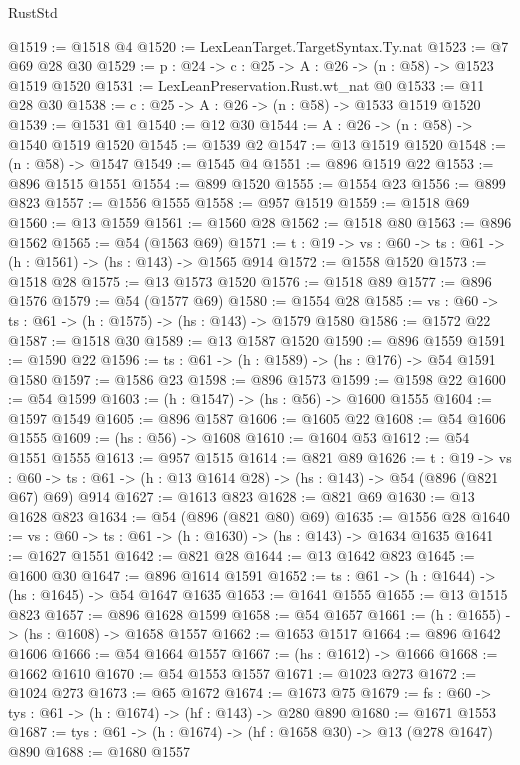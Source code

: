 \begin{lexlean}{RustStd}
\begin{coremodule}
@1519 := @1518 @4
@1520 := LexLeanTarget.TargetSyntax.Ty.nat
@1523 := @7 @69 @28 @30
@1529 := {p : @24} -> {c : @25} -> {A : @26} -> (n : @58) -> @1523 @1519 @1520
@1531 := LexLeanPreservation.Rust.wt_nat @0
@1533 := @11 @28 @30
@1538 := {c : @25} -> {A : @26} -> (n : @58) -> @1533 @1519 @1520
@1539 := @1531 @1
@1540 := @12 @30
@1544 := {A : @26} -> (n : @58) -> @1540 @1519 @1520
@1545 := @1539 @2
@1547 := @13 @1519 @1520
@1548 := (n : @58) -> @1547
@1549 := @1545 @4
@1551 := @896 @1519 @22
@1553 := @896 @1515 @1551
@1554 := @899 @1520
@1555 := @1554 @23
@1556 := @899 @823
@1557 := @1556 @1555
@1558 := @957 @1519
@1559 := @1518 @69
@1560 := @13 @1559
@1561 := @1560 @28
@1562 := @1518 @80
@1563 := @896 @1562
@1565 := @54 (@1563 @69)
@1571 := {t : @19} -> {vs : @60} -> {ts : @61} -> (h : @1561) -> (hs : @143) -> @1565 @914
@1572 := @1558 @1520
@1573 := @1518 @28
@1575 := @13 @1573 @1520
@1576 := @1518 @89
@1577 := @896 @1576
@1579 := @54 (@1577 @69)
@1580 := @1554 @28
@1585 := {vs : @60} -> {ts : @61} -> (h : @1575) -> (hs : @143) -> @1579 @1580
@1586 := @1572 @22
@1587 := @1518 @30
@1589 := @13 @1587 @1520
@1590 := @896 @1559
@1591 := @1590 @22
@1596 := {ts : @61} -> (h : @1589) -> (hs : @176) -> @54 @1591 @1580
@1597 := @1586 @23
@1598 := @896 @1573
@1599 := @1598 @22
@1600 := @54 @1599
@1603 := (h : @1547) -> (hs : @56) -> @1600 @1555
@1604 := @1597 @1549
@1605 := @896 @1587
@1606 := @1605 @22
@1608 := @54 @1606 @1555
@1609 := (hs : @56) -> @1608
@1610 := @1604 @53
@1612 := @54 @1551 @1555
@1613 := @957 @1515
@1614 := @821 @89
@1626 := {t : @19} ->
  {vs : @60} -> {ts : @61} -> (h : @13 @1614 @28) -> (hs : @143) -> @54 (@896 (@821 @67) @69) @914
@1627 := @1613 @823
@1628 := @821 @69
@1630 := @13 @1628 @823
@1634 := @54 (@896 (@821 @80) @69)
@1635 := @1556 @28
@1640 := {vs : @60} -> {ts : @61} -> (h : @1630) -> (hs : @143) -> @1634 @1635
@1641 := @1627 @1551
@1642 := @821 @28
@1644 := @13 @1642 @823
@1645 := @1600 @30
@1647 := @896 @1614 @1591
@1652 := {ts : @61} -> (h : @1644) -> (hs : @1645) -> @54 @1647 @1635
@1653 := @1641 @1555
@1655 := @13 @1515 @823
@1657 := @896 @1628 @1599
@1658 := @54 @1657
@1661 := (h : @1655) -> (hs : @1608) -> @1658 @1557
@1662 := @1653 @1517
@1664 := @896 @1642 @1606
@1666 := @54 @1664 @1557
@1667 := (hs : @1612) -> @1666
@1668 := @1662 @1610
@1670 := @54 @1553 @1557
@1671 := @1023 @273
@1672 := @1024 @273
@1673 := @65 @1672
@1674 := @1673 @75
@1679 := {fs : @60} -> {tys : @61} -> (h : @1674) -> (hf : @143) -> @280 @890
@1680 := @1671 @1553
@1687 := {tys : @61} -> (h : @1674) -> (hf : @1658 @30) -> @13 (@278 @1647) @890
@1688 := @1680 @1557

\end{coremodule}
\end{lexlean}
